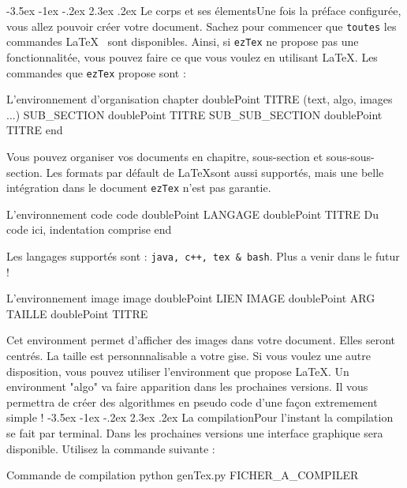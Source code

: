 \documentclass[11pt, a4paper]{article}
\makeatletter
\renewcommand{\subsection}{\@startsection{subsection}{1}{\z@}%
          {-3.5ex \@plus -1ex \@minus -.2ex}%
          {2.3ex \@plus .2ex}%
          {\reset@font\large\bfseries}}
\renewcommand{\subsubsection}{\@startsection{subsubsection}{1}{\z@}%
          {-3.5ex \@plus -1ex \@minus -.2ex}%
          {2.3ex \@plus .2ex}%
          {\reset@font\large\bfseries}}
\makeatother
\begin{document}
\subsubsection{Le corps et ses élements}Une fois la préface configurée, vous allez pouvoir créer votre document. Sachez pour commencer que \texttt{toutes} les commandes \LaTeX~ sont disponibles.
Ainsi, si \texttt{ezTex} ne propose pas une fonctionnalitée, vous pouvez faire ce que vous voulez en utilisant \LaTeX. \newline
Les commandes que \texttt{ezTex} propose sont :
\begin{bashCode}{L'environnement d'organisation} 
chapter doublePoint TITRE
	(text, algo, images ...)
	SUB_SECTION doublePoint TITRE
	SUB_SUB_SECTION doublePoint TITRE
end
\end{bashCode} 
Vous pouvez organiser vos documents en chapitre, sous-section et sous-sous-section. Les formats par défault de \LaTeX sont aussi supportés, mais
une belle intégration dans le document \texttt{ezTex} n'est pas garantie. \newline
\begin{bashCode}{L'environnement code} 
code doublePoint LANGAGE doublePoint TITRE
	Du code ici, indentation
		comprise
end
\end{bashCode} 
Les langages supportés sont : \texttt{java, c++, tex \& bash}. Plus a venir dans le futur ! \newline
\begin{bashCode}{L'environnement image} 
image doublePoint LIEN IMAGE doublePoint ARG TAILLE doublePoint TITRE
\end{bashCode} 
Cet environment permet d'afficher des images dans votre document. Elles seront centrés. La taille est personnnalisable a votre gise. Si vous voulez une autre
disposition, vous pouvez utiliser l'environment que propose \LaTeX. \newline
Un environment "algo" va faire apparition dans les prochaines versions. Il vous permettra de créer des algorithmes en pseudo code d'une façon extremement simple !
\subsection{La compilation}Pour l'instant la compilation se fait par terminal. Dans les prochaines versions une interface graphique sera disponible. Utilisez la commande suivante :
\begin{bashCode}{Commande de compilation} 
python genTex.py FICHER\_A\_COMPILER
\end{bashCode} 
\newpage
\end{document}

